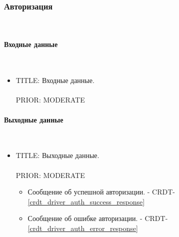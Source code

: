 \subsubsection{Авторизация} \mbox{} \\ \label{}

    \paragraph{Входные данные} \mbox{} \\ \label{}

		\begin{itemize}

		\item{

		  TITLE: Входные данные.\\
		  \\
		  PRIOR: MODERATE\\

		}

		\end{itemize}

    \paragraph{Выходные данные} \mbox{} \\

      \begin{itemize}

        \item{

          TITLE: Выходные данные.\\
          \\
          PRIOR: MODERATE\\

        }

        \begin{itemize}
          \item Сообщение об успешной авторизации. - CRDT-\ref{crdt_driver_auth_success_response}
          \item Сообщение об ошибке авторизации. - CRDT-\ref{crdt_driver_auth_error_response}
        \end{itemize}

      \end{itemize}

